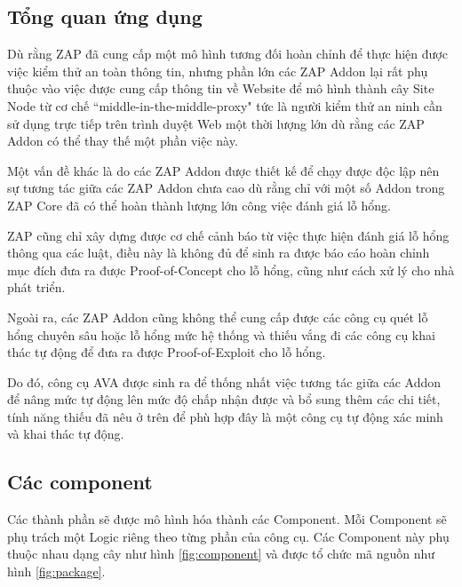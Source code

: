 \documentclass[./../main.tex]{subfiles}
\begin{document}
\subsection{Tổng quan ứng dụng}

Dù rằng ZAP đã cung cấp một mô hình tương đối hoàn chỉnh để thực hiện được
việc kiểm thử an toàn thông tin, nhưng phần lớn các ZAP Addon lại rất
phụ thuộc vào việc được cung cấp thông tin về Website để mô hình thành
cây Site Node từ cơ chế “middle-in-the-middle-proxy" tức là người kiểm
thử an ninh cần sử dụng trực tiếp trên trình duyệt Web một thời lượng lớn
dù rằng các ZAP Addon có thể thay thế một phần việc này.

Một vấn đề khác là do các ZAP Addon được thiết kế để chạy được độc lập
nên sự tương tác giữa các ZAP Addon chưa cao dù rằng chỉ với một số Addon
trong ZAP Core đã có thể hoàn thành lượng lớn công việc đánh giá lỗ hổng.

ZAP cũng chỉ xây dựng được cơ chế cảnh báo từ việc thực hiện đánh giá
lỗ hổng thông qua các luật, điều này là không đủ để sinh ra được báo
cáo hoàn chỉnh mục đích đưa ra được Proof-of-Concept cho lỗ hổng, cũng
như cách xử lý cho nhà phát triển.

Ngoài ra, các ZAP Addon cũng không thể cung cấp được các công cụ quét
lỗ hổng chuyên sâu hoặc lỗ hổng mức hệ thống và thiếu vắng đi các công
cụ khai thác tự động để đưa ra được Proof-of-Exploit cho lỗ hổng.

Do đó, công cụ AVA được sinh ra để thống nhất việc tương tác giữa các
Addon để nâng mức tự động lên mức độ chấp nhận được và bổ sung thêm
các chi tiết, tính năng thiếu đã nêu ở trên để phù hợp đây là một công
cụ tự động xác minh và khai thác tự động.

\subsection{Các component}
Các thành phần sẽ được mô hình hóa thành các Component. Mỗi Component
sẽ phụ trách một Logic riêng theo từng phần của công cụ. Các Component
này phụ thuộc nhau dạng cây như hình \ref{fig:component} và được tổ chức
mã nguồn như hình \ref{fig:package}.
\end{document}
